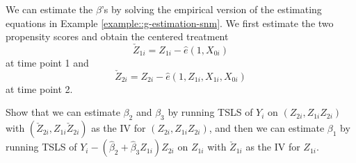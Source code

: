 \begin{HomeworkProblem}\label{exr:29-6}


We can estimate the $\beta$'s by solving the empirical version of the estimating equations in Example \ref{example::g-estimation-snm}. We first estimate the two propensity scores and obtain the centered treatment
\[
\check{Z}_{1i} = Z_{1i} - \hat{e}(1,X_{0i})
\]
 at time point 1 and
 \[
 \check{Z}_{2i} = Z_{2i}  - \hat{e}(1, Z_{1i}, X_{1i}, X_{0i})
 \]
 at time point 2.


Show that we can estimate $\beta_2$ and $\beta_3$ by running TSLS of $Y_i$ on $(Z_{2i}, Z_{1i} Z_{2i} )$ with $( \check{Z}_{2i} ,  Z_{1i}\check{Z}_{2i} )$ as the IV for $(Z_{2i}, Z_{1i} Z_{2i} )$, and then we can estimate $\beta_1$ by running TSLS of $Y_i - (\hat{\beta}_2+\hat{\beta}_3 Z_{1i}) Z_{2i}$ on $Z_{1i}$ with $\check{Z}_{1i} $ as the IV for $Z_{1i}$.




\end{HomeworkProblem}

